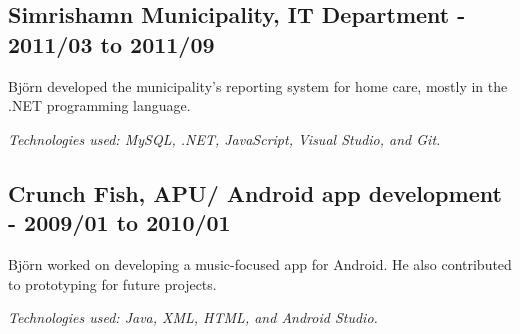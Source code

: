\begin{minipage}[t]{0.9\textwidth}
\subsection*{\textcolor{colorTitelErfarenhet}{Simrishamn Municipality, IT Department - 2011/03 to 2011/09}}
Björn developed the municipality's reporting system for home care, mostly in the .NET programming language.

\vspace{5pt}\textit{Technologies used: MySQL, .NET, JavaScript, Visual Studio, and Git.}


\vspace{15pt} %
\subsection*{\textcolor{colorTitelErfarenhet}{Crunch Fish, APU/ Android app development - 2009/01 to 2010/01}}
Björn worked on developing a music-focused app for Android. He also contributed to prototyping for future projects.

\vspace{5pt}\textit{Technologies used: Java, XML, HTML, and Android Studio.}
\end{minipage}%
